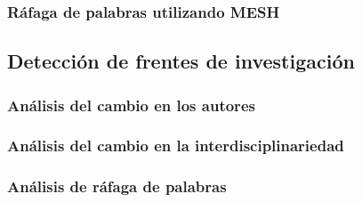 \documentclass[11pt]{article}
\begin{document}
    \hypertarget{ruxe1faga-de-palabras-utilizando-mesh}{%
\subsubsection{Ráfaga de palabras utilizando
MESH}\label{ruxe1faga-de-palabras-utilizando-mesh}}

    \hypertarget{detecciuxf3n-de-frentes-de-investigaciuxf3n}{%
\subsection{Detección de frentes de
investigación}\label{detecciuxf3n-de-frentes-de-investigaciuxf3n}}

    \hypertarget{anuxe1lisis-del-cambio-en-los-autores}{%
\subsubsection{Análisis del cambio en los
autores}\label{anuxe1lisis-del-cambio-en-los-autores}}

    \hypertarget{anuxe1lisis-del-cambio-en-la-interdisciplinariedad}{%
\subsubsection{Análisis del cambio en la
interdisciplinariedad}\label{anuxe1lisis-del-cambio-en-la-interdisciplinariedad}}

    \hypertarget{anuxe1lisis-de-ruxe1faga-de-palabras}{%
\subsubsection{Análisis de ráfaga de
palabras}\label{anuxe1lisis-de-ruxe1faga-de-palabras}}


    
    
    
    
\end{document}

